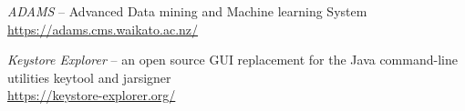 
\begin{thebibliography}{999}

		\textit{ADAMS} -- Advanced Data mining and Machine learning System \\
		\url{https://adams.cms.waikato.ac.nz/}{}

		\textit{Keystore Explorer} -- an open source GUI replacement for
		the Java command-line utilities keytool and jarsigner \\
		\url{https://keystore-explorer.org/}{}

\end{thebibliography}

